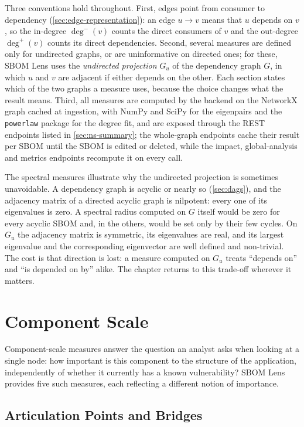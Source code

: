 Three conventions hold throughout. First, edges point from consumer to dependency (\autoref{sec:edge-representation}): an edge \(u \to v\) means that \(u\) depends on \(v\), so the in-degree \(\deg^-(v)\) counts the direct consumers of \(v\) and the out-degree \(\deg^+(v)\) counts its direct dependencies. Second, several measures are defined only for undirected graphs, or are uninformative on directed ones; for these, SBOM Lens uses the \textit{undirected projection} \(G_u\) of the dependency graph \(G\), in which \(u\) and \(v\) are adjacent if either depends on the other. Each section states which of the two graphs a measure uses, because the choice changes what the result means. Third, all measures are computed by the backend on the NetworkX graph \citep{Hagberg2008} cached at ingestion, with NumPy and SciPy for the eigenpairs and the \texttt{powerlaw} package for the degree fit, and are exposed through the REST endpoints listed in \autoref{sec:ns-summary}; the whole-graph endpoints cache their result per SBOM until the SBOM is edited or deleted, while the impact, global-analysis and metrics endpoints recompute it on every call.

The spectral measures illustrate why the undirected projection is sometimes unavoidable. A dependency graph is acyclic or nearly so (\autoref{sec:dags}), and the adjacency matrix of a directed acyclic graph is nilpotent: every one of its eigenvalues is zero. A spectral radius computed on \(G\) itself would be zero for every acyclic SBOM and, in the others, would be set only by their few cycles. On \(G_u\) the adjacency matrix is symmetric, its eigenvalues are real, and its largest eigenvalue and the corresponding eigenvector are well defined and non-trivial. The cost is that direction is lost: a measure computed on \(G_u\) treats ``depends on'' and ``is depended on by'' alike. The chapter returns to this trade-off wherever it matters.


\section{Component Scale}
\label{sec:component-scale}

Component-scale measures answer the question an analyst asks when looking at a single node: how important is this component to the structure of the application, independently of whether it currently has a known vulnerability? SBOM Lens provides five such measures, each reflecting a different notion of importance.


\subsection{Articulation Points and Bridges}
\label{sec:ns-articulation}

